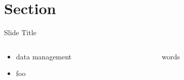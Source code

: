 \section{Section}

\begin{frame}{Slide Title}
\begin{columns}
\begin{column}{0.6\textwidth}
\begin{itemize}
\item data management
\item foo
\end{itemize}
\end{column}
\begin{column}{0.4\textwidth}
\begin{center}
words
\end{center}
\end{column}
\end{columns}
\end{frame}
